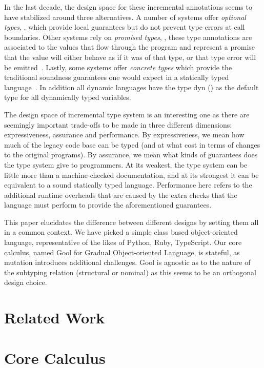 \documentclass{llncs}
\begin{document}
In the last decade, the design space for these incremental annotations seems
to have stabilized around three alternatives.  A number of systems offer
\emph{optional types}, ,
\cite{PluggableTypes,Bracha93,typescript13,oopsla09} which provide local
guarantees but do not prevent type errors at call boundaries. Other systems
rely on \emph{promised types}, , these type annotations are
associated to the values that flow through the program and represent a
promise that the value will either behave as if it was of that type, or that
type error will be emitted~\cite{siek14,tf-popl08}.  Lastly, some systems
offer \emph{concrete types} which provide the traditional soundness
guarantees one would expect in a statically typed
language~\cite{thorn,stongscript,csharp}. In addition all dynamic languages
have the type dyn (\dyn) as the default type for all dynamically typed
variables.

The design space of incremental type system is an interesting one as there
are seemingly important trade-offs to be made in three different dimensions:
expressiveness, assurance and performance.  By expressiveness, we mean how
much of the legacy code base can be typed (and at what cost in terms of
changes to the original programs).  By assurance, we mean what kinds of
guarantees does the type system give to programmers. At its weakest, the
type system can be little more than a machine-checked documentation, and at
its strongest it can be equivalent to a sound statically typed language.
Performance here refers to the additional runtime overheads that are caused
by the extra checks that the language must perform to provide the
aforementioned guarantees.

\newcommand{\name}{{\sf Gool}\xspace}

This paper elucidates the difference between different designs by setting
them all in a common context. We have picked a simple class based
object-oriented language, representative of the likes of Python, Ruby,
TypeScript. Our core calculus, named \name for Gradual Object-oriented
Language, is stateful, as mutation introduces additional challenges. \name
is agnostic as to the nature of the subtyping relation (structural or
nominal) as this seems to be an orthogonal design choice.

\section{Related Work}

\section{Core Calculus}
\end{document}
